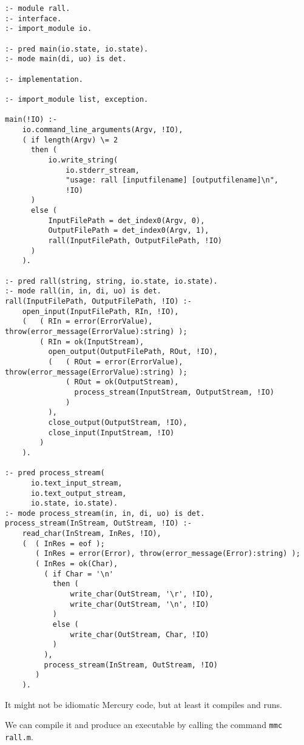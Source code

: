 \begin{lstlisting}[language=Mercury,caption=Full code for \texttt{rall.m}]
:- module rall.
:- interface.
:- import_module io.

:- pred main(io.state, io.state).
:- mode main(di, uo) is det.

:- implementation.

:- import_module list, exception.

main(!IO) :-
    io.command_line_arguments(Argv, !IO),
    ( if length(Argv) \= 2
      then (
          io.write_string(
              io.stderr_stream,
              "usage: rall [inputfilename] [outputfilename]\n",
              !IO)
      )
      else (
          InputFilePath = det_index0(Argv, 0),
          OutputFilePath = det_index0(Argv, 1),
          rall(InputFilePath, OutputFilePath, !IO)
      )
    ).

:- pred rall(string, string, io.state, io.state).
:- mode rall(in, in, di, uo) is det.
rall(InputFilePath, OutputFilePath, !IO) :-
    open_input(InputFilePath, RIn, !IO),
    (   ( RIn = error(ErrorValue), throw(error_message(ErrorValue):string) );
        ( RIn = ok(InputStream),
          open_output(OutputFilePath, ROut, !IO),
          (   ( ROut = error(ErrorValue), throw(error_message(ErrorValue):string) );
              ( ROut = ok(OutputStream),
                process_stream(InputStream, OutputStream, !IO)
              )
          ),
          close_output(OutputStream, !IO),
          close_input(InputStream, !IO)
        )
    ).

:- pred process_stream(
      io.text_input_stream,
      io.text_output_stream,
      io.state, io.state).
:- mode process_stream(in, in, di, uo) is det.
process_stream(InStream, OutStream, !IO) :-
    read_char(InStream, InRes, !IO),
    (  ( InRes = eof );
       ( InRes = error(Error), throw(error_message(Error):string) );
       ( InRes = ok(Char),
         ( if Char = '\n'
           then (
               write_char(OutStream, '\r', !IO),
               write_char(OutStream, '\n', !IO)
           )
           else (
               write_char(OutStream, Char, !IO)
           )
         ),
         process_stream(InStream, OutStream, !IO)
       )
    ).
\end{lstlisting}

It might not be idiomatic Mercury code, but at least it compiles and runs.

We can compile it and produce an executable by calling the command \texttt{mmc rall.m}.

